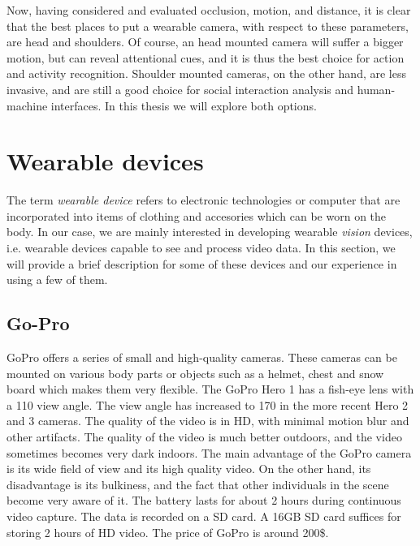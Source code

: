 Now, having considered and evaluated occlusion, motion, and distance, it is clear that the best places to put a wearable camera, with respect to these parameters, are head and shoulders. Of course, an head mounted camera will suffer a bigger motion, but can reveal attentional cues, and it is thus the best choice for action and activity recognition. Shoulder mounted cameras, on the other hand, are less invasive, and are still a good choice for social interaction analysis and human-machine interfaces. In this thesis we will explore both options.

\section{Wearable devices}
The term \textit{wearable device} refers to electronic technologies or computer that are incorporated into items of clothing and accesories which can be worn on the body. In our case, we are mainly interested in developing wearable \textit{vision} devices, i.e. wearable devices capable to see and process video data. In this section, we will provide a brief description for some of these devices and our experience in using a few of them.

\subsection{Go-Pro}
GoPro offers a series of small and high-quality cameras. These cameras can be mounted on various
body parts or objects such as a helmet, chest and snow board which makes them very flexible. The
GoPro Hero 1 has a fish-eye lens with a 110 view angle. The view angle has increased to 170 in
the more recent Hero 2 and 3 cameras. The quality of the video is in HD, with minimal motion
blur and other artifacts. The quality of the video is much better outdoors, and the video sometimes
becomes very dark indoors. The main advantage of the GoPro camera is its wide field of view
and its high quality video. On the other hand, its disadvantage is its bulkiness, and the fact that
other individuals in the scene become very aware of it. The battery lasts for about 2 hours during
continuous video capture. The data is recorded on a SD card. A 16GB SD card suffices for storing
2 hours of HD video. The price of GoPro is around 200\$.

